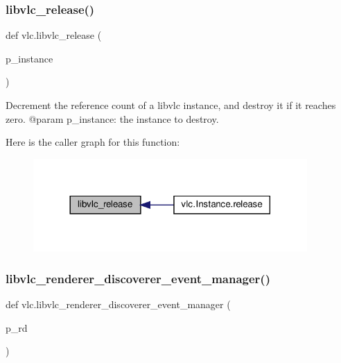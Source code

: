 \subsubsection{\texorpdfstring{libvlc\+\_\+release()}{libvlc\_release()}}
{\footnotesize\ttfamily def vlc.\+libvlc\+\_\+release (\begin{DoxyParamCaption}\item[{}]{p\+\_\+instance }\end{DoxyParamCaption})}

\begin{DoxyVerb}Decrement the reference count of a libvlc instance, and destroy it
if it reaches zero.
@param p_instance: the instance to destroy.
\end{DoxyVerb}
 Here is the caller graph for this function\+:
\nopagebreak
\begin{figure}[H]
\begin{center}
\leavevmode
\includegraphics[width=296pt]{namespacevlc_acb9159355d8b06728e1c00a49ae25309_icgraph}
\end{center}
\end{figure}
\mbox{\label{namespacevlc_a1ea941d7c32dbab6a943838c3d2dda32}} 
\subsubsection{\texorpdfstring{libvlc\+\_\+renderer\+\_\+discoverer\+\_\+event\+\_\+manager()}{libvlc\_renderer\_discoverer\_event\_manager()}}
{\footnotesize\ttfamily def vlc.\+libvlc\+\_\+renderer\+\_\+discoverer\+\_\+event\+\_\+manager (\begin{DoxyParamCaption}\item[{}]{p\+\_\+rd }\end{DoxyParamCaption})}

